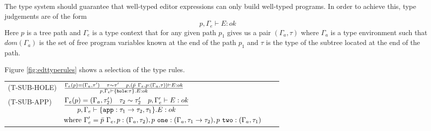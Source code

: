 The type system should guarantee that well-typed editor expressions
can only build well-typed programs. In order to achieve this, type
judgements are of the form
%
\[ p,\Gamma_e \vdash E : ok \]
%
Here $p$ is a tree path and $\Gamma_e$ is a type context that for any
given path $p_1$ gives us a pair $(\Gamma_a,\tau)$
where $\Gamma_a$ is a type environment such that $dom(\Gamma_a)$ is
the set of free program variables known at the end of the path $p_1$
and $\tau$ is the type of the subtree located at the end of the path.

Figure \ref{fig:edttyperules} shows a selection of the type rules.

\begin{figure*}
  \center
  \renewcommand{\arraystretch}{2}
  \begin{tabular}{llll}
    \scriptsize(T-SUB-HOLE)  & $\TSubHole$ & &           \\[4mm]
    \scriptsize(T-SUB-APP)   & \scriptsize$ \TSubApp$ & & \\
  \end{tabular}
  \caption{Selected type rules for editor expressions}
  \label{fig:edttyperules}
\end{figure*}

